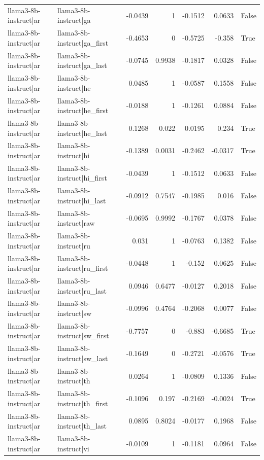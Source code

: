 \begin{table}
\begin{tabular}{l l r r r r l}
llama3-8b-instruct|ar & llama3-8b-instruct|ga & -0.0439 & 1 & -0.1512 & 0.0633 & False \\
llama3-8b-instruct|ar & llama3-8b-instruct|ga_first & -0.4653 & 0 & -0.5725 & -0.358 & True \\
llama3-8b-instruct|ar & llama3-8b-instruct|ga_last & -0.0745 & 0.9938 & -0.1817 & 0.0328 & False \\
llama3-8b-instruct|ar & llama3-8b-instruct|he & 0.0485 & 1 & -0.0587 & 0.1558 & False \\
llama3-8b-instruct|ar & llama3-8b-instruct|he_first & -0.0188 & 1 & -0.1261 & 0.0884 & False \\
llama3-8b-instruct|ar & llama3-8b-instruct|he_last & 0.1268 & 0.022 & 0.0195 & 0.234 & True \\
llama3-8b-instruct|ar & llama3-8b-instruct|hi & -0.1389 & 0.0031 & -0.2462 & -0.0317 & True \\
llama3-8b-instruct|ar & llama3-8b-instruct|hi_first & -0.0439 & 1 & -0.1512 & 0.0633 & False \\
llama3-8b-instruct|ar & llama3-8b-instruct|hi_last & -0.0912 & 0.7547 & -0.1985 & 0.016 & False \\
llama3-8b-instruct|ar & llama3-8b-instruct|raw & -0.0695 & 0.9992 & -0.1767 & 0.0378 & False \\
llama3-8b-instruct|ar & llama3-8b-instruct|ru & 0.031 & 1 & -0.0763 & 0.1382 & False \\
llama3-8b-instruct|ar & llama3-8b-instruct|ru_first & -0.0448 & 1 & -0.152 & 0.0625 & False \\
llama3-8b-instruct|ar & llama3-8b-instruct|ru_last & 0.0946 & 0.6477 & -0.0127 & 0.2018 & False \\
llama3-8b-instruct|ar & llama3-8b-instruct|sw & -0.0996 & 0.4764 & -0.2068 & 0.0077 & False \\
llama3-8b-instruct|ar & llama3-8b-instruct|sw_first & -0.7757 & 0 & -0.883 & -0.6685 & True \\
llama3-8b-instruct|ar & llama3-8b-instruct|sw_last & -0.1649 & 0 & -0.2721 & -0.0576 & True \\
llama3-8b-instruct|ar & llama3-8b-instruct|th & 0.0264 & 1 & -0.0809 & 0.1336 & False \\
llama3-8b-instruct|ar & llama3-8b-instruct|th_first & -0.1096 & 0.197 & -0.2169 & -0.0024 & True \\
llama3-8b-instruct|ar & llama3-8b-instruct|th_last & 0.0895 & 0.8024 & -0.0177 & 0.1968 & False \\
llama3-8b-instruct|ar & llama3-8b-instruct|vi & -0.0109 & 1 & -0.1181 & 0.0964 & False \\

\end{tabular}
\end{table}
